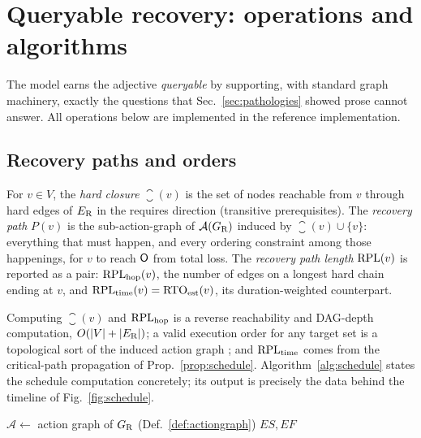 \section{Queryable recovery: operations and algorithms}
\label{sec:queries}

The model earns the adjective \emph{queryable} by supporting, with standard graph machinery, exactly the questions that Sec.~\ref{sec:pathologies} showed prose cannot answer. All operations below are implemented in the reference implementation.

\subsection{Recovery paths and orders}

\begin{definition}
\label{def:path}
For $v \in V$, the \emph{hard closure} $\closure(v)$ is the set of nodes reachable from $v$ through hard edges of $E_{\mathrm{R}}$ in the requires direction (transitive prerequisites). The \emph{recovery path} $P(v)$ is the sub-action-graph of $\mathcal{A}(G_{\mathrm{R}})$ induced by $\closure(v) \cup \{v\}$: everything that must happen, and every ordering constraint among those happenings, for $v$ to reach $\mathsf{O}$ from total loss. The \emph{recovery path length} $\mathrm{RPL}(v)$ is reported as a pair: $\mathrm{RPL}_{\mathrm{hop}}(v)$, the number of edges on a longest hard chain ending at $v$, and $\mathrm{RPL}_{\mathrm{time}}(v) = \mathrm{RTO}_{\mathrm{est}}(v)$, its duration-weighted counterpart.
\end{definition}

Computing $\closure(v)$ and $\mathrm{RPL}_{\mathrm{hop}}$ is a reverse reachability and DAG-depth computation, $O(|V| + |E_{\mathrm{R}}|)$; a valid execution order for any target set is a topological sort of the induced action graph \citep{kahn1962topological}; and $\mathrm{RPL}_{\mathrm{time}}$ comes from the critical-path propagation of Prop.~\ref{prop:schedule}. Algorithm~\ref{alg:schedule} states the schedule computation concretely; its output is precisely the data behind the timeline of Fig.~\ref{fig:schedule}.

\begin{algorithm}[t]
\small
\caption{\textsc{EarliestSchedule}$(\GR)$ --- earliest start/finish and $\rto$ for all nodes.}
\label{alg:schedule}
$\mathcal{A} \leftarrow$ action graph of $G_{\mathrm{R}}$ (Def.~\ref{def:actiongraph})\;
\Return $\mathit{ES}, \mathit{EF}$\;
\end{algorithm}

